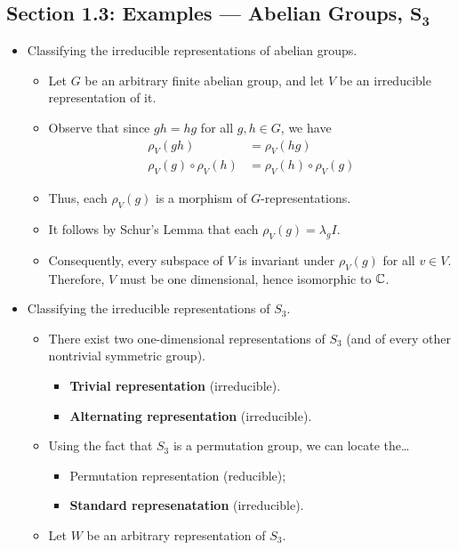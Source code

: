 \documentclass[../notes.tex]{subfiles}
\begin{document}
\subsection*{Section 1.3: Examples --- Abelian Groups, $\bm{S_3}$}
\begin{itemize}
    \item Classifying the irreducible representations of abelian groups.
    \begin{itemize}
        \item Let $G$ be an arbitrary finite abelian group, and let $V$ be an irreducible representation of it.
        \item Observe that since $gh=hg$ for all $g,h\in G$, we have
        \begin{align*}
            \rho_V(gh) &= \rho_V(hg)\\
            \rho_V(g)\circ\rho_V(h) &= \rho_V(h)\circ\rho_V(g)
        \end{align*}
        \item Thus, each $\rho_V(g)$ is a morphism of $G$-representations.
        \item It follows by Schur's Lemma that each $\rho_V(g)=\lambda_gI$.
        \item Consequently, every subspace of $V$ is invariant under $\rho_V(g)$ for all $v\in V$. Therefore, $V$ must be one dimensional, hence isomorphic to $\mathbb{C}$.
    \end{itemize}
    \item Classifying the irreducible representations of $S_3$.
    \begin{itemize}
        \item There exist two one-dimensional representations of $S_3$ (and of every other nontrivial symmetric group).
        \begin{itemize}
            \item \textbf{Trivial representation} (irreducible).
            \item \textbf{Alternating representation} (irreducible).
        \end{itemize}
        \item Using the fact that $S_3$ is a permutation group, we can locate the\dots
        \begin{itemize}
            \item Permutation representation (reducible);
            \item \textbf{Standard represenatation} (irreducible).
        \end{itemize}
        \item Let $W$ be an arbitrary representation of $S_3$.

\end{itemize}
\end{itemize}
\end{document}
